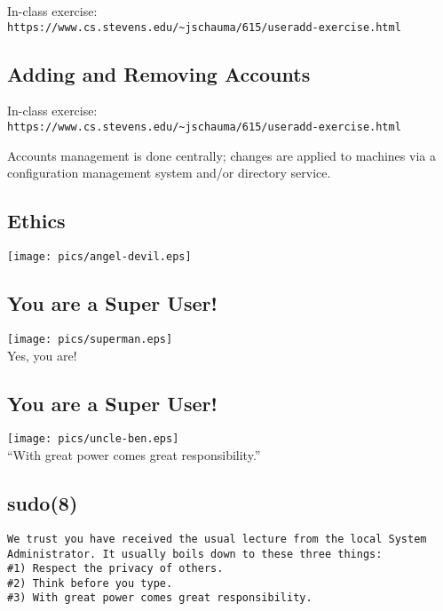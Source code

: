 \documentclass[xga]{xdvislides}
\begin{document}
\vfill
In-class exercise: \\
\verb+https://www.cs.stevens.edu/~jschauma/615/useradd-exercise.html+
\vfill

\subsection{Adding and Removing Accounts}
\vfill
In-class exercise: \\
\verb+https://www.cs.stevens.edu/~jschauma/615/useradd-exercise.html+

\vspace{.5in}
Accounts management is done centrally; changes are applied to machines via a
configuration management system and/or directory service.
\vfill

\subsection{Ethics}
\begin{center}
	\texttt{[image: pics/angel-devil.eps]}
\end{center}

\subsection{You are a Super User!}
\begin{center}
	\texttt{[image: pics/superman.eps]} \\
	\small
	Yes, you are!
	\Normalsize
\end{center}

\subsection{You are a Super User!}
\begin{center}
	\texttt{[image: pics/uncle-ben.eps]} \\
	\addvspace{.2in}
	\Huge
	``With great power comes great responsibility.''
	\Normalsize
\end{center}

\subsection{sudo(8)}
\vspace*{\fill}
\begin{verbatim}
We trust you have received the usual lecture from the local System
Administrator. It usually boils down to these three things:
#1) Respect the privacy of others.
#2) Think before you type.
#3) With great power comes great responsibility.
\end{verbatim}
\vspace*{\fill}
\end{document}
